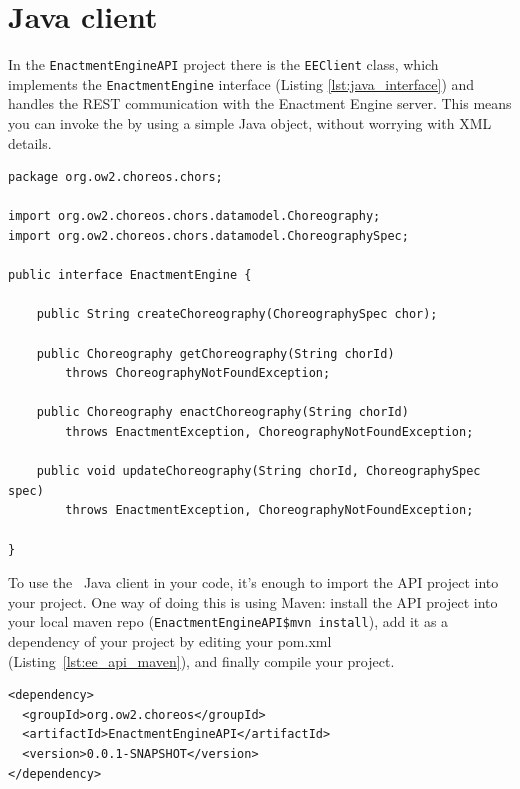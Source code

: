 \section{Java client}
\label{sec:client}

In the \verb!EnactmentEngineAPI! project there is the \verb!EEClient! class, which implements the \verb!EnactmentEngine! interface (Listing \ref{lst:java_interface}) and handles the REST communication with the Enactment Engine server. This means you can invoke the \ee by using a simple Java object, without worrying with XML details.

{\footnotesize
\lstset{language=Java}
\begin{lstlisting}[caption=\ee\ Java interface., label=lst:java_interface]
package org.ow2.choreos.chors;

import org.ow2.choreos.chors.datamodel.Choreography;
import org.ow2.choreos.chors.datamodel.ChoreographySpec;

public interface EnactmentEngine {

    public String createChoreography(ChoreographySpec chor);

    public Choreography getChoreography(String chorId) 
        throws ChoreographyNotFoundException;

    public Choreography enactChoreography(String chorId) 
        throws EnactmentException, ChoreographyNotFoundException;

    public void updateChoreography(String chorId, ChoreographySpec spec) 
        throws EnactmentException, ChoreographyNotFoundException;

}
\end{lstlisting}
}

To use the \ee\ Java client in your code, it's enough to import the API project into your project. One way of doing this is using Maven: install the API project into your local maven repo (\texttt{EnactmentEngineAPI\$mvn install}), add it as a dependency of your project by editing your pom.xml (Listing~\ref{lst:ee_api_maven}), and finally compile your project.

{\footnotesize
\lstset{language=XML}
\begin{lstlisting}[caption=Adding EnactmentEngineAPI as a dependency of your project., label=lst:ee_api_maven]
<dependency>
  <groupId>org.ow2.choreos</groupId>
  <artifactId>EnactmentEngineAPI</artifactId>
  <version>0.0.1-SNAPSHOT</version>
</dependency>
\end{lstlisting}
}

